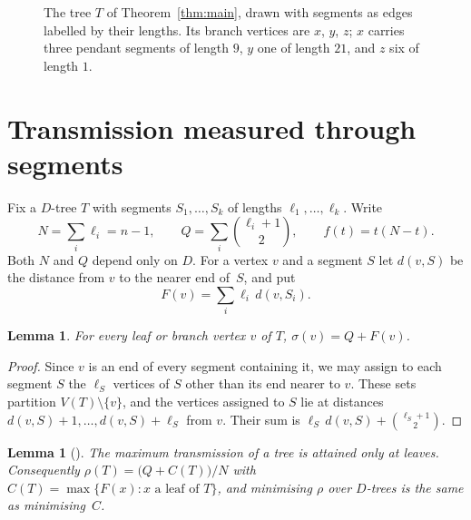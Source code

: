 \documentclass[11pt]{amsart}
\newtheorem{lemma}[thm]{Lemma}
\theoremstyle{definition}
\newcommand{\sig}{\sigma}
\begin{document}
\begin{figure}[t]
\centering
{}
\caption{The tree $T$ of Theorem~\ref{thm:main}, drawn with segments as edges labelled by their lengths. Its branch
vertices are $x$, $y$, $z$; $x$ carries three pendant segments of length $9$, $y$ one of length $21$, and $z$ six of
length $1$.}
\label{fig:T}
\end{figure}

\section{Transmission measured through segments}\label{sec:id}

Fix a $D$-tree $T$ with segments $S_1,\dots,S_k$ of lengths $\ell_1,\dots,\ell_k$. Write
\[
N=\sum_{i}\ell_i=n-1,\qquad Q=\sum_i\binom{\ell_i+1}{2},\qquad f(t)=t(N-t).
\]
Both $N$ and $Q$ depend only on $D$. For a vertex $v$ and a segment $S$ let $d(v,S)$ be the distance from $v$ to the
nearer end of~$S$, and put
\[
F(v)=\sum_i \ell_i\, d(v,S_i).
\]

\begin{lemma}\label{lem:id}
For every leaf or branch vertex $v$ of $T$, $\sig(v)=Q+F(v)$.
\end{lemma}

\begin{proof}
Since $v$ is an end of every segment containing it, we may assign to each segment $S$ the $\ell_S$ vertices of $S$
other than its end nearer to $v$. These sets
partition $V(T)\setminus\{v\}$, and the vertices assigned to $S$ lie at distances
$d(v,S)+1,\dots,d(v,S)+\ell_S$ from $v$. Their sum is $\ell_S\,d(v,S)+\binom{\ell_S+1}{2}$.
\end{proof}

\begin{lemma}[{\cite[Observation~2.7]{ADHM}}]\label{lem:leaf}
The maximum transmission of a tree is attained only at leaves. Consequently
$\rho(T)=\bigl(Q+C(T)\bigr)/N$ with $C(T)=\max\{F(x): x \text{ a leaf of } T\}$, and minimising $\rho$ over $D$-trees
is the same as minimising~$C$.
\end{lemma}
\end{document}
